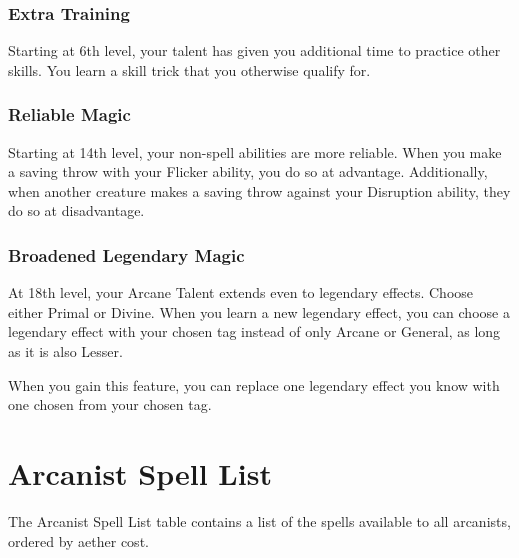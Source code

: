 \subsubsection{Extra Training}
Starting at 6th level, your talent has given you additional time to practice other skills. You learn a skill trick that you otherwise qualify for.

\subsubsection{Reliable Magic}
Starting at 14th level, your non-spell abilities are more reliable. When you make a saving throw with your Flicker ability, you do so at advantage. Additionally, when another creature makes a saving throw against your Disruption ability, they do so at disadvantage.

\subsubsection{Broadened Legendary Magic}
At 18th level, your Arcane Talent extends even to legendary effects. Choose either Primal or Divine. When you learn a new legendary effect, you can choose a legendary effect with your chosen tag instead of only Arcane or General, as long as it is also Lesser.

When you gain this feature, you can replace one legendary effect you know with one chosen from your chosen tag.

\section{Arcanist Spell List}
The Arcanist Spell List table contains a list of the spells available to all arcanists, ordered by aether cost.

